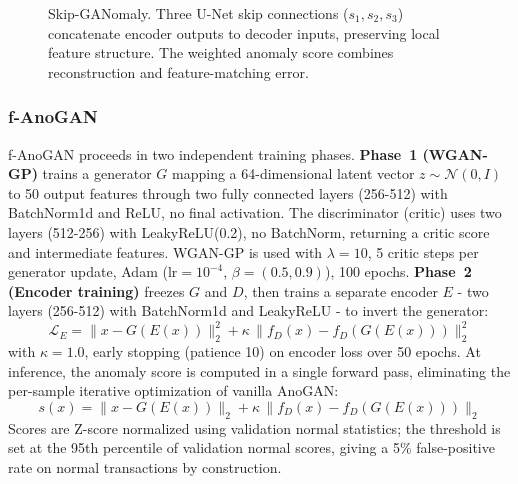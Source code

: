\documentclass[conference]{IEEEtran}
\begin{document}
\begin{figure}[htbp]
{}
\caption{Skip-GANomaly. Three U-Net skip connections ($s_1, s_2, s_3$)
concatenate encoder outputs to decoder inputs, preserving local feature
structure. The weighted anomaly score combines reconstruction and
feature-matching error.}
\label{fig:sgan}
\end{figure}

\subsubsection{f-AnoGAN}

f-AnoGAN proceeds in two independent training phases. \textbf{Phase~1
(WGAN-GP)} trains a generator $G$ mapping a 64-dimensional latent vector
$z \sim \mathcal{N}(0,I)$ to 50 output features through two fully connected
layers (256-512) with BatchNorm1d and ReLU, no final activation. The
discriminator (critic) uses two layers (512-256) with LeakyReLU(0.2), no
BatchNorm, returning a critic score and intermediate features. WGAN-GP is
used with $\lambda=10$, 5 critic steps per generator update, Adam
($\text{lr}=10^{-4}$, $\beta=(0.5, 0.9)$), 100 epochs. \textbf{Phase~2
(Encoder training)} freezes $G$ and $D$, then trains a separate encoder $E$
- two layers (256-512) with BatchNorm1d and LeakyReLU - to invert the
generator:
\begin{equation}
\mathcal{L}_E = \|x - G(E(x))\|_2^2 + \kappa\,\|f_D(x) - f_D(G(E(x)))\|_2^2
\end{equation}
with $\kappa=1.0$, early stopping (patience 10) on encoder loss over 50
epochs. At inference, the anomaly score is computed in a single forward pass,
eliminating the per-sample iterative optimization of vanilla AnoGAN:
\begin{equation}
s(x) = \|x - G(E(x))\|_2 + \kappa\,\|f_D(x) - f_D(G(E(x)))\|_2
\end{equation}
Scores are Z-score normalized using validation normal statistics; the
threshold is set at the 95th percentile of validation normal scores,
giving a 5\% false-positive rate on normal transactions by construction.
\end{document}
